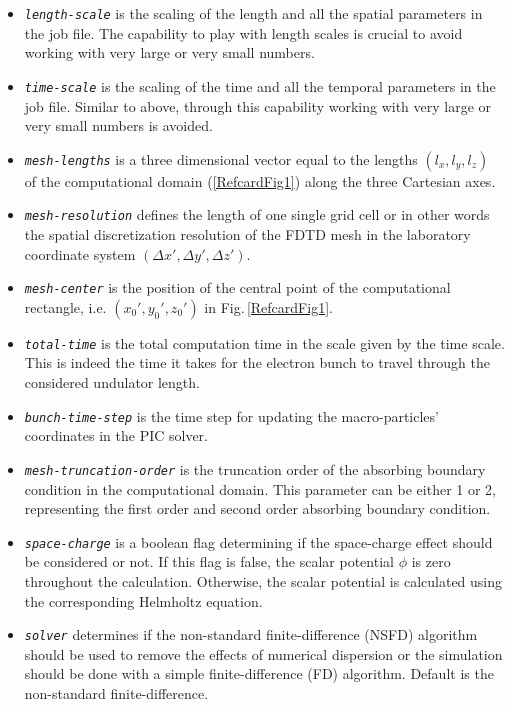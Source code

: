 \begin{itemize}
	\item {\tt \em \small length-scale} is the scaling of the length and all the spatial parameters in the job file. The capability to play with length scales is crucial to avoid working with very large or very small numbers.
	\item {\tt \em \small time-scale} is the scaling of the time and all the temporal parameters in the job file. Similar to above, through this capability working with very large or very small numbers is avoided.
	\item {\tt \em \small mesh-lengths} is a three dimensional vector equal to the lengths $(l_x,l_y,l_z)$ of the computational domain (\ref{RefcardFig1}) along the three Cartesian axes.
	\item {\tt \em \small mesh-resolution} defines the length of one single grid cell or in other words the spatial discretization resolution of the FDTD mesh in the laboratory coordinate system $(\Delta x',\Delta y',\Delta z')$.
	\item {\tt \em \small mesh-center} is the position of the central point of the computational rectangle, i.e. $(x_0',y_0',z_0')$ in Fig.\,\ref{RefcardFig1}.
	\item {\tt \em \small total-time} is the total computation time in the scale given by the time scale. This is indeed the time it takes for the electron bunch to travel through the considered undulator length.
	\item {\tt \em \small bunch-time-step} is the time step for updating the macro-particles' coordinates in the PIC solver.
	\item {\tt \em \small mesh-truncation-order} is the truncation order of the absorbing boundary condition in the computational domain. This parameter can be either 1 or 2, representing the first order and second order absorbing boundary condition.
	\item {\tt \em \small space-charge} is a boolean flag determining if the space-charge effect should be considered or not. If this flag is false, the scalar potential $\phi$ is zero throughout the calculation. Otherwise, the scalar potential is calculated using the corresponding Helmholtz equation.
	\item {\tt \em \small solver} determines if the non-standard finite-difference (NSFD) algorithm should be used to remove the effects of numerical dispersion or the simulation should be done with a simple finite-difference (FD) algorithm. Default is the non-standard finite-difference.
\end{itemize}

